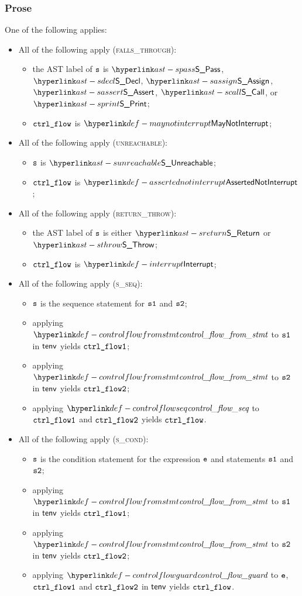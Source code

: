 \subsubsection{Prose}
One of the following applies:
\begin{itemize}
  \item All of the following apply (\textsc{falls\_through}):
  \begin{itemize}
    \item the AST label of $\texttt{s}$ is $\SPass$, $\SDecl$, $\SAssign$, $\SAssert$, $\SCall$, or $\SPrint$;
    \item $\texttt{ctrl\_flow}$ is $\maynotinterrupt$;
  \end{itemize}

  \item All of the following apply (\textsc{unreachable}):
  \begin{itemize}
    \item $\texttt{s}$ is $\SUnreachable$;
    \item $\texttt{ctrl\_flow}$ is $\assertednotinterrupt$;
  \end{itemize}

  \item All of the following apply (\textsc{return\_throw}):
  \begin{itemize}
    \item the AST label of $\texttt{s}$ is either $\SReturn$ or $\SThrow$;
    \item $\texttt{ctrl\_flow}$ is $\interrupt$;
  \end{itemize}

  \item All of the following apply (\textsc{s\_seq}):
  \begin{itemize}
    \item $\texttt{s}$ is the sequence statement for $\texttt{s1}$ and $\texttt{s2}$;
    \item applying $\controlflowfromstmt$ to $\texttt{s1}$ in $\textsf{tenv}$ yields $\texttt{ctrl\_flow1}$;
    \item applying $\controlflowfromstmt$ to $\texttt{s2}$ in $\textsf{tenv}$ yields $\texttt{ctrl\_flow2}$;
    \item applying $\controlflowseq$ to $\texttt{ctrl\_flow1}$ and $\texttt{ctrl\_flow2}$ yields $\texttt{ctrl\_flow}$.
  \end{itemize}

  \item All of the following apply (\textsc{s\_cond}):
  \begin{itemize}
    \item $\texttt{s}$ is the condition statement for the expression $\texttt{e}$ and statements $\texttt{s1}$ and $\texttt{s2}$;
    \item applying $\controlflowfromstmt$ to $\texttt{s1}$ in $\textsf{tenv}$ yields $\texttt{ctrl\_flow1}$;
    \item applying $\controlflowfromstmt$ to $\texttt{s2}$ in $\textsf{tenv}$ yields $\texttt{ctrl\_flow2}$;
    \item applying $\controlflowguard$ to $\texttt{e}$, $\texttt{ctrl\_flow1}$ and $\texttt{ctrl\_flow2}$ in $\textsf{tenv}$ yields $\texttt{ctrl\_flow}$.
  \end{itemize}


\end{itemize}
